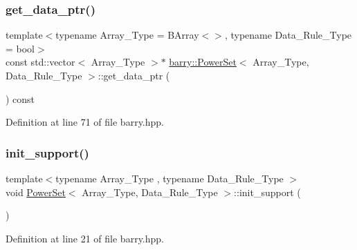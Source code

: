 \subsubsection{\texorpdfstring{get\+\_\+data\+\_\+ptr()}{get\_data\_ptr()}}
{\footnotesize\ttfamily template$<$typename Array\+\_\+\+Type  = B\+Array$<$$>$, typename Data\+\_\+\+Rule\+\_\+\+Type  = bool$>$ \\
const std\+::vector$<$ Array\+\_\+\+Type $>$$\ast$ \hyperlink{classbarry_1_1_power_set}{barry\+::\+Power\+Set}$<$ Array\+\_\+\+Type, Data\+\_\+\+Rule\+\_\+\+Type $>$\+::get\+\_\+data\+\_\+ptr (\begin{DoxyParamCaption}{ }\end{DoxyParamCaption}) const\hspace{0.3cm}{\ttfamily [inline]}}



Definition at line 71 of file barry.\+hpp.

\mbox{\label{classbarry_1_1_power_set_a8eefc9606c6339938a8d9adcd0d7e153}} 
\subsubsection{\texorpdfstring{init\+\_\+support()}{init\_support()}}
{\footnotesize\ttfamily template$<$typename Array\+\_\+\+Type , typename Data\+\_\+\+Rule\+\_\+\+Type $>$ \\
void \hyperlink{classbarry_1_1_power_set}{Power\+Set}$<$ Array\+\_\+\+Type, Data\+\_\+\+Rule\+\_\+\+Type $>$\+::init\+\_\+support (\begin{DoxyParamCaption}{ }\end{DoxyParamCaption})\hspace{0.3cm}{\ttfamily [inline]}}



Definition at line 21 of file barry.\+hpp.

\mbox{\label{classbarry_1_1_power_set_a8da3f3a278b35999f232cb9f9312b0cc}} 
